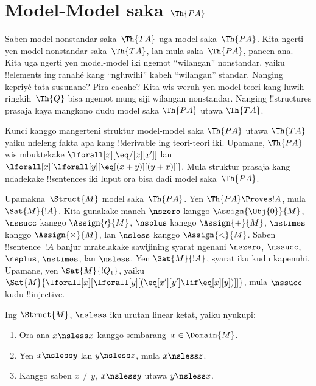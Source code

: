 \documentclass[../../../include/open-logic-section]{subfiles}
\begin{document}
\section{Model-Model saka $\Th{PA}$}

\begin{explain}
Saben model nonstandar saka~$\Th{TA}$
uga model saka~$\Th{PA}$.
Kita ngerti yen model nonstandar
saka~$\Th{TA}$, lan mula
saka~$\Th{PA}$, pancen ana.
Kita uga ngerti yen model-model iki
ngemot “wilangan” nonstandar,
yaiku !!{element}s ing ranahé
kang “ngluwihi” kabeh
“wilangan” standar.
Nanging kepriyé tata susunane?
Pira cacahe?
Kita wis weruh yen model
teori kang luwih ringkih~$\Th{Q}$
bisa ngemot mung siji
wilangan nonstandar.
Nanging !!{structure}s
prasaja kaya mangkono
dudu model saka $\Th{PA}$
utawa $\Th{TA}$.

Kunci kanggo mangerteni
struktur model-model saka $\Th{PA}$
utawa $\Th{TA}$
yaiku ndeleng fakta apa kang
!!{derivable} ing teori-teori iki.
Upamane, $\Th{PA}$
wis mbuktekake
$\lforall[x][\eq/[x][x']]$
lan
$\lforall[x][\lforall[y][\eq[(x+y)][(y+x)]]]$.
Mula struktur prasaja
kang ndadekake !!{sentence}s
iki luput ora bisa dadi
model saka~$\Th{PA}$.

Upamakna~$\Struct{M}$
model saka~$\Th{PA}$.
Yen $\Th{PA} \Proves
!A$, mula $\Sat{M}{!A}$.
Kita gunakake maneh
$\nszero$ kanggo
$\Assign{\Obj{0}}{M}$,
$\nssucc$ kanggo
$\Assign{\prime}{M}$,
$\nsplus$ kanggo
$\Assign{+}{M}$,
$\nstimes$ kanggo
$\Assign{\times}{M}$,
lan $\nsless$ kanggo
$\Assign{<}{M}$.
Saben !!{sentence}~$!A$
banjur mratelakake
sawijining syarat ngenani
$\nszero$, $\nssucc$,
$\nsplus$, $\nstimes$,
lan $\nsless$.
Yen $\Sat{M}{!A}$,
syarat iku kudu kapenuhi.
Upamane, yen
$\Sat{M}{!Q_1}$,
yaiku
$\Sat{M}{\lforall[x][\lforall[y][(\eq[x'][y'] \lif \eq[x][y])]]}$,
mula $\nssucc$ kudu
!!{injective}.
\end{explain}

\begin{prop}
Ing $\Struct{M}$,
$\nsless$ iku urutan linear ketat,
yaiku nyukupi:
\begin{enumerate}
\item Ora ana $x \nsless x$
kanggo sembarang~$x \in \Domain{M}$.
\item Yen $x \nsless y$
lan $y \nsless z$,
mula $x \nsless z$.
\item Kanggo saben $x \neq y$,
$x \nsless y$ utawa $y \nsless x$.
\end{enumerate}
\end{prop}
\end{document}
